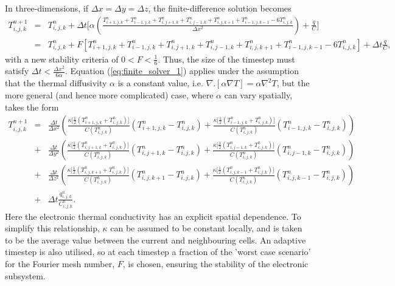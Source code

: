 In three-dimensions, if $\Delta x = \Delta y = \Delta z$, the
finite-difference solution becomes
\begin{eqnarray}
T_{i,j,k}^{n+1}  &=& T_{i,j,k}^n + \Delta t \bigg[  \alpha \left(\frac{T_{i+1,j,k}^n + T_{i-1,j,k}^{n} + T_{i,j+1,k}^n + T_{i,j-1,k}^{n} + T_{i,j,k+1}^n + T_{i-1,j,k-1}^{n} - 6T_{i,j,k}^n}{\Delta x^2}\right) + \frac{\dot{q}}{C}  \bigg] \nonumber \\
                        &=& T_{i,j,k}^n + F [T_{i+1,j,k}^n + T_{i-1,j,k}^{n} + T_{i,j+1,k}^n + T_{i,j-1,k}^{n} + T_{i,j,k+1}^n + T_{i-1,j,k-1}^{n} - 6T_{i,j,k}^n] +  \Delta t  \frac{\dot{q}}{C} \label{eq:finite_solver_1},
\end{eqnarray}
with a new stability criteria of $0 < F < \frac{1}{6}$. Thus, the size
of the timestep must satisfy $\Delta t < \frac{\Delta x^2}{6 \alpha}$.
Equation (\ref{eq:finite_solver_1}) applies under the assumption that
the thermal diffusivity $\alpha$ is a constant value, i.e.
$\nabla . [\alpha \nabla T ] = \alpha \nabla^2 T$, but the more general
(and hence more complicated) case, where $\alpha$ can vary
spatially, takes the form
\begin{eqnarray}
T_{i,j,k}^{n+1}  &=& \frac{\Delta t}{\Delta x^2} \left( \frac{\kappa \big[ \frac{1}{2} (T^n_{i+1,j,k} + T^n_{i,j,k})  \big]}{C(T^n_{i,j,k})} (T^n_{i+1,j,k} - T^n_{i,j,k}) +  \frac{\kappa \big[ \frac{1}{2} (T^n_{i-1,j,k} + T^n_{i,j,k})  \big]}{C(T^n_{i,j,k})} (T^n_{i-1,j,k} - T^n_{i,j,k}) \right) \nonumber \\
                        &+& \frac{\Delta t}{\Delta y^2} \left( \frac{\kappa \big[ \frac{1}{2} (T^n_{i,j+1,k} + T^n_{i,j,k})  \big]}{C(T^n_{i,j,k})} (T^n_{i,j+1,k} - T^n_{i,j,k}) +  \frac{\kappa \big[ \frac{1}{2} (T^n_{i,j-1,k} + T^n_{i,j,k})  \big]}{C(T^n_{i,j,k})} (T^n_{i,j-1,k} - T^n_{i,j,k}) \right) \nonumber \\
                        &+& \frac{\Delta t}{\Delta z^2} \left( \frac{\kappa \big[ \frac{1}{2} (T^n_{i,j,k+1} + T^n_{i,j,k})  \big]}{C(T^n_{i,j,k})} (T^n_{i,j,k+1} - T^n_{i,j,k}) + \frac{\kappa \big[ \frac{1}{2} (T^n_{i,j,k-1} + T^n_{i,j,k})  \big]}{C(T^n_{i,j,k})} (T^n_{i,j,k-1} - T^n_{i,j,k}) \right) \nonumber \\
                        &+& \Delta t \frac{\dot{q^n_{i,j,k}}}{C^n_{i,j,k}} \label{eq:finite_solver_2}.
\end{eqnarray}
Here the electronic thermal conductivity has an explicit spatial
dependence. To simplify this relationship, $\kappa$ can be assumed
to be constant locally, and is taken to be the average value between
the current and neighbouring cells. An adaptive timestep is also
utilised, so at each timestep a fraction of the 'worst case scenario'
for the Fourier mesh number, $F$, is chosen, ensuring the stability
of the electronic subsystem.

